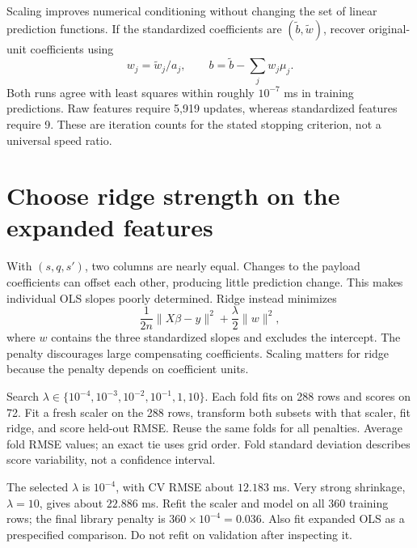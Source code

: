 Scaling improves numerical conditioning without changing the set of linear prediction functions. If the standardized coefficients are $(\tilde b,\tilde w)$, recover original-unit coefficients using
\[w_j=\tilde w_j/a_j,\qquad b=\tilde b-\sum_jw_j\mu_j.\]
Both runs agree with least squares within roughly $10^{-7}$ ms in training predictions. Raw features require 5,919 updates, whereas standardized features require 9. These are iteration counts for the stated stopping criterion, not a universal speed ratio.

\section{Choose ridge strength on the expanded features}
With $(s,q,s')$, two columns are nearly equal. Changes to the payload coefficients can offset each other, producing little prediction change. This makes individual OLS slopes poorly determined.
Ridge instead minimizes
\[
\frac{1}{2n}\|X\beta-y\|^2+\frac\lambda2\|w\|^2,
\]
where $w$ contains the three standardized slopes and excludes the intercept. The penalty discourages large compensating coefficients. Scaling matters for ridge because the penalty depends on coefficient units.

Search $\lambda\in\{10^{-4},10^{-3},10^{-2},10^{-1},1,10\}$. Each fold fits on 288 rows and scores on 72. Fit a fresh scaler on the 288 rows, transform both subsets with that scaler, fit ridge, and score held-out RMSE. Reuse the same folds for all penalties. Average fold RMSE values; an exact tie uses grid order. Fold standard deviation describes score variability, not a confidence interval.

The selected $\lambda$ is $10^{-4}$, with CV RMSE about $12.183$ ms. Very strong shrinkage, $\lambda=10$, gives about $22.886$ ms. Refit the scaler and model on all 360 training rows; the final library penalty is $360\times10^{-4}=0.036$. Also fit expanded OLS as a prespecified comparison. Do not refit on validation after inspecting it.

